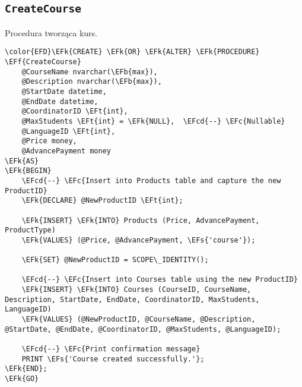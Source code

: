 \documentclass[11pt]{article}
\newcommand{\EFc}[1]{\textcolor{EFc}{\textit{#1}}} %
\newcommand{\EFcd}[1]{\textcolor{EFcd}{\textit{#1}}} %
\newcommand{\EFs}[1]{\textcolor{EFs}{#1}} %
\newcommand{\EFk}[1]{\textcolor{EFk}{\textbf{#1}}} %
\newcommand{\EFb}[1]{\textcolor{EFb}{\textbf{#1}}} %
\newcommand{\EFf}[1]{\textcolor{EFf}{#1}} %
\newcommand{\EFt}[1]{\textcolor{EFt}{\textbf{#1}}} %
\begin{document}
\subsection{\texttt{CreateCourse}}
\label{sec:orgf9f3836}
Procedura tworząca kurs.
\begin{Code}
\begin{Verbatim}
\color{EFD}\EFk{CREATE} \EFk{OR} \EFk{ALTER} \EFk{PROCEDURE} \EFf{CreateCourse}
    @CourseName nvarchar(\EFb{max}),
    @Description nvarchar(\EFb{max}),
    @StartDate datetime,
    @EndDate datetime,
    @CoordinatorID \EFt{int},
    @MaxStudents \EFt{int} = \EFk{NULL},  \EFcd{--} \EFc{Nullable}
    @LanguageID \EFt{int},
    @Price money,
    @AdvancePayment money
\EFk{AS}
\EFk{BEGIN}
    \EFcd{--} \EFc{Insert into Products table and capture the new ProductID}
    \EFk{DECLARE} @NewProductID \EFt{int};

    \EFk{INSERT} \EFk{INTO} Products (Price, AdvancePayment, ProductType)
    \EFk{VALUES} (@Price, @AdvancePayment, \EFs{'course'});

    \EFk{SET} @NewProductID = SCOPE\_IDENTITY();

    \EFcd{--} \EFc{Insert into Courses table using the new ProductID}
    \EFk{INSERT} \EFk{INTO} Courses (CourseID, CourseName, Description, StartDate, EndDate, CoordinatorID, MaxStudents, LanguageID)
    \EFk{VALUES} (@NewProductID, @CourseName, @Description, @StartDate, @EndDate, @CoordinatorID, @MaxStudents, @LanguageID);

    \EFcd{--} \EFc{Print confirmation message}
    PRINT \EFs{'Course created successfully.'};
\EFk{END};
\EFk{GO}
\end{Verbatim}
\end{Code}
\end{document}
